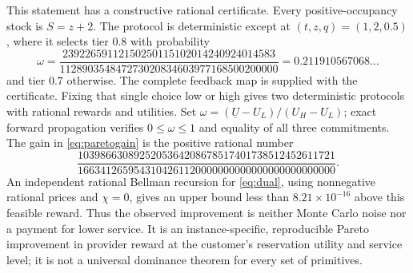 This statement has a constructive rational certificate. Every positive-occupancy stock is $S=z+2$. The protocol is deterministic except at $(t,z,q)=(1,2,0.5)$, where it selects tier $0.8$ with probability
\[
 \omega=
 \frac{23922659112150250115102014240924014583}
 {112890354847273020834603977168500200000}
 =0.211910567068\ldots
\]
and tier $0.7$ otherwise. The complete feedback map is supplied with the certificate. Fixing that single choice low or high gives two deterministic protocols with rational rewards and utilities. Set $\omega=(\underline U-U_L)/(U_H-U_L)$; exact forward propagation verifies $0\leq\omega\leq1$ and equality of all three commitments. The gain in \eqref{eq:paretogain} is the positive rational number
\[
 \frac{1039866308925205364208678517401738512452611721}
 {1663412659543104261120000000000000000000000000}.
\]
An independent rational Bellman recursion for \eqref{eq:dual}, using nonnegative rational prices and $\chi=0$, gives an upper bound less than $8.21\times10^{-16}$ above this feasible reward. Thus the observed improvement is neither Monte Carlo noise nor a payment for lower service. It is an instance-specific, reproducible Pareto improvement in provider reward at the customer's reservation utility and service level; it is not a universal dominance theorem for every set of primitives.
